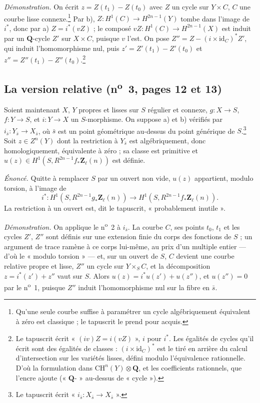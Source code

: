 \documentclass[11pt,a4paper]{article}
\begin{document}
\emph{Démonstration.} On écrit $z = Z(t_1) - Z(t_0)$ avec $Z$ un cycle sur
$Y \times C$, $C$ une courbe lisse connexe.\footnote{Qu'une seule courbe suffise
à paramétrer un cycle algébriquement équivalent à zéro est classique ; le
tapuscrit le prend pour acquis.} Par b), $Z\colon H^1(C) \to H^{2n-1}(Y)$ tombe
dans l'image de $i^*$, donc par a) $Z = i^*(vZ)$ ; le composé
$vZ\colon H^1(C) \to H^{2n-1}(X)$ est induit par un $\mathbf{Q}$-cycle $Z'$ sur
$X \times C$, puisque $v$ l'est. On pose $Z'' = Z - (i \times
\mathrm{id}_C)^*Z'$, qui induit l'homomorphisme nul, puis $z' = Z'(t_1) -
Z'(t_0)$ et $z'' = Z''(t_1) - Z''(t_0)$.\footnote{Le tapuscrit écrit
« $(iv)Z = i(vZ)$ », $i$ pour $i^*$. Les égalités de cycles qu'il écrit sont des
égalités de classes : $(i \times \mathrm{id}_C)^*$ est le tiré en arrière du
calcul d'intersection sur les variétés lisses, défini modulo l'équivalence
rationnelle. D'où la formulation dans $\mathrm{CH}^n(Y) \otimes \mathbf{Q}$, et
les coefficients rationnels, que l'encre ajoute (« $\mathbf{Q}$- » au-dessus de
« cycle »).}

\subsection*{La version relative (n\textsuperscript{o}~3, pages 12 et 13)}

Soient maintenant $X$, $Y$ propres et lisses sur $S$ régulier et connexe,
$g\colon X \to S$, $f\colon Y \to S$, et $i\colon Y \to X$ un $S$-morphisme.
On suppose a) et b) vérifiés par $i_{\bar s}\colon Y_{\bar s} \to X_{\bar s}$,
où $\bar s$ est un point géométrique au-dessus du point générique de
$S$.\footnote{Le tapuscrit écrit « $i_{\bar s}\colon X_{\bar s} \to X_{\bar
s}$ ».} Soit $z \in Z^n(Y)$ dont la restriction à $Y_{\bar s}$ est
algébriquement, donc homologiquement, équivalente à zéro ; sa classe est
primitive et $u(z) \in H^1(S, R^{2n-1}f_*\mathbf{Z}_\ell(n))$ est définie.

\emph{Énoncé.} Quitte à remplacer $S$ par un ouvert non vide,
$u(z)$ appartient, modulo torsion, à l'image de
\[ i^*\colon H^1(S, R^{2n-1}g_*\mathbf{Z}_\ell(n)) \to H^1(S,
R^{2n-1}f_*\mathbf{Z}_\ell(n)) . \]
La restriction à un ouvert est, dit le tapuscrit, « probablement inutile ».

\emph{Démonstration.} On applique le n\textsuperscript{o}~2 à $i_{\bar s}$. La
courbe $C$, ses points $t_0$, $t_1$ et les cycles $Z'$, $Z''$ sont définis sur
une extension finie du corps des fonctions de $S$ ; un argument de trace ramène à
ce corps lui-même, au prix d'un multiple entier --- d'où le « modulo torsion » ---
et, sur un ouvert de $S$, $C$ devient une courbe relative propre et lisse, $Z''$
un cycle sur $Y \times_S C$, et la décomposition $z = i^*(z') + z''$ vaut sur
$S$. Alors $u(z) = i^*u(z') + u(z'')$, et $u(z'') = 0$ par le
n\textsuperscript{o}~1, puisque $Z''$ induit l'homomorphisme nul sur la fibre en
$\bar s$.
\end{document}
